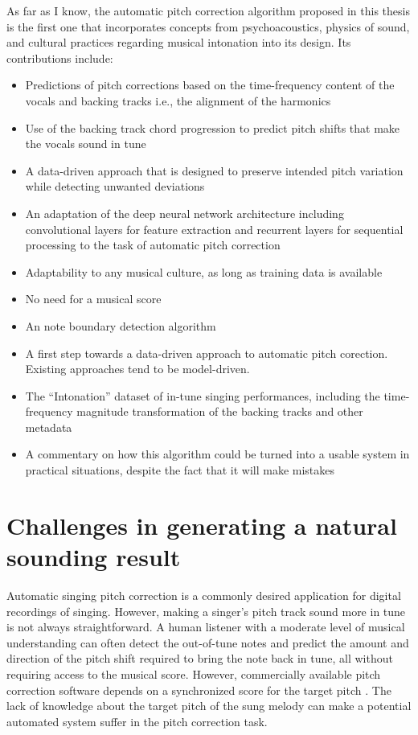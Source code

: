 As far as I know, the automatic pitch correction algorithm proposed in this thesis is the first one that incorporates concepts from psychoacoustics, physics of sound, and cultural practices regarding musical intonation into its design. Its contributions include:
\begin{itemize}
    \item Predictions of pitch corrections based on the time-frequency content of the vocals and backing tracks i.e., the alignment of the harmonics
    \item Use of the backing track chord progression to predict pitch shifts that make the vocals sound in tune
    \item A data-driven approach that is designed to preserve intended pitch variation while detecting unwanted deviations
    \item An adaptation of the deep neural network architecture including convolutional layers for feature extraction and recurrent layers for sequential processing to the task of automatic pitch correction
    \item Adaptability to any musical culture, as long as training data is available
    \item No need for a musical score
    \item An note boundary detection algorithm
    \item A first step towards a data-driven approach to automatic pitch corection. Existing approaches tend to be model-driven.
    \item The ``Intonation'' dataset of in-tune singing performances, including the time-frequency magnitude transformation of the backing tracks and other metadata
    \item A commentary on how this algorithm could be turned into a usable system in practical situations, despite the fact that it will make mistakes
\end{itemize}

\section{Challenges in generating a natural sounding result}

Automatic singing pitch correction is a commonly desired application for digital recordings of singing. However, making a singer's pitch track sound more in tune is not always straightforward. A human listener with a moderate level of musical understanding can often detect the out-of-tune notes and predict the amount and direction of the pitch shift required to bring the note back in tune, all without requiring access to the musical score. However, commercially available pitch correction software depends on a synchronized score for the target pitch \cite{antares:2018}. The lack of knowledge about the target pitch of the sung melody can make a potential automated system suffer in the pitch correction task.

